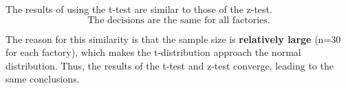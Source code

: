 \documentclass[a4paper, 10pt]{article}
\begin{document}
\begin{tosubmit}
The results of using the t-test are similar to those of the z-test.
\[ \boxed{\text{The decisions are the same for all factories.}} \]

The reason for this similarity is that the sample size is \textbf{relatively large} (n=30 for each factory), which makes the t-distribution approach the normal distribution.
Thus, the results of the t-test and z-test converge, leading to the same conclusions.
\end{tosubmit}
\end{document}
